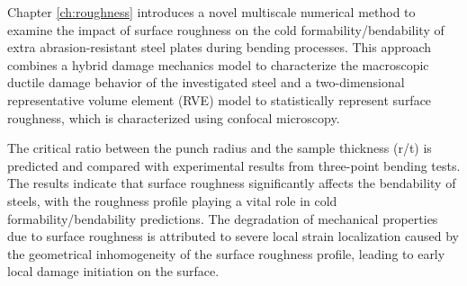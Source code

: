 


Chapter \ref{ch:roughness} introduces a novel multiscale numerical method to examine the impact of surface roughness on the cold formability/bendability of extra abrasion-resistant steel plates during bending processes. This approach combines a hybrid damage mechanics model to characterize the macroscopic ductile damage behavior of the investigated steel and a two-dimensional representative volume element (RVE) model to statistically represent surface roughness, which is characterized using confocal microscopy.

The critical ratio between the punch radius and the sample thickness (r/t) is predicted and compared with experimental results from three-point bending tests. The results indicate that surface roughness significantly affects the bendability of steels, with the roughness profile playing a vital role in cold formability/bendability predictions. The degradation of mechanical properties due to surface roughness is attributed to severe local strain localization caused by the geometrical inhomogeneity of the surface roughness profile, leading to early local damage initiation on the surface.

